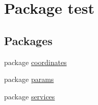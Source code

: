 \hypertarget{namespacetest}{}\section{Package test}
\label{namespacetest}
\subsection*{Packages}
\begin{DoxyCompactItemize}
\item 
package \hyperlink{namespacetest_1_1coordinates}{coordinates}
\item 
package \hyperlink{namespacetest_1_1params}{params}
\item 
package \hyperlink{namespacetest_1_1services}{services}
\end{DoxyCompactItemize}
